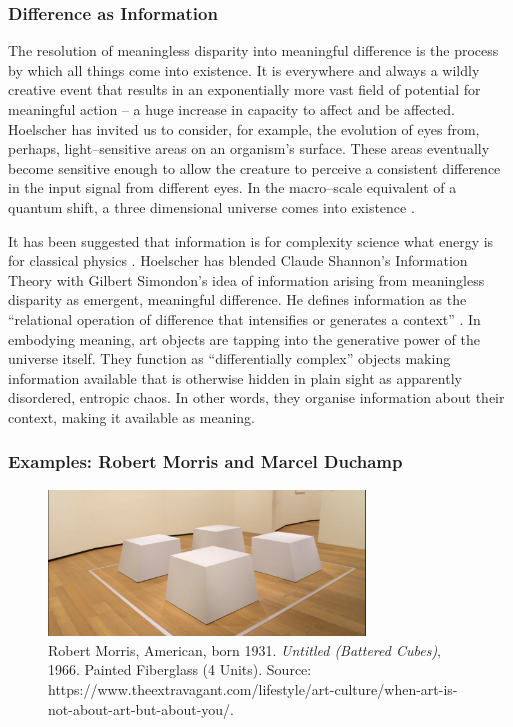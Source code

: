 \documentclass[letterpaper]{article}
\begin{document}
    \subsubsection{Difference as Information}

    The resolution of meaningless disparity into meaningful difference is the process by which all things come into existence. It is everywhere and always a wildly creative event that results in an exponentially more vast field of potential for meaningful action – a huge increase in capacity to affect and be affected. Hoelscher has invited us to consider, for example, the evolution of eyes from, perhaps, light–sensitive areas on an organism's surface. These areas eventually become sensitive enough to allow the creature to perceive a consistent difference in the input signal from different eyes. In the macro–scale equivalent of a quantum shift, a three dimensional universe comes into existence \citep[p.5]{HoelscherArtAsInfrmtn2021}.

    It has been suggested that information is for complexity science what energy is for classical physics \citep[0:52]{CrutchfieldIntrdctnToCmplxty2018} \citep{CrutfieldRtAlSgntrsOfInfnty2015}. Hoelscher has blended Claude Shannon's Information Theory with Gilbert Simondon's idea of information arising from meaningless disparity as emergent, meaningful difference. He defines information as the “relational operation of difference that intensifies or generates a context” \citep[p.6]{HoelscherArtAsInfrmtn2021}. In embodying meaning, art objects are tapping into the generative power of the universe itself. They function as “differentially complex” \citep[p.74]{HoelscherArtAsInfrmtn2021} objects making information available that is otherwise hidden in plain sight as apparently disordered, entropic chaos. In other words, they organise information about their context, making it available as meaning.

    \subsubsection{Examples: Robert Morris and Marcel Duchamp}

    \begin{figure}[h]
        \includegraphics[width=3.31in]{robert-morris-cubes.png}
        \caption{Robert Morris, American, born 1931. \emph{Untitled (Battered Cubes)}, 1966. Painted Fiberglass (4 Units). Source: https://www.theextravagant.com/lifestyle/art-culture/when-art-is-not-about-art-but-about-you/.}
        \label{fig:robert-morris-cubes}
    \end{figure}
\end{document}
